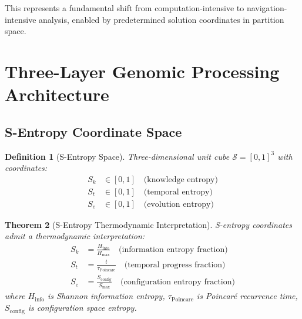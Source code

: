\documentclass[11pt,a4paper]{article}
\newtheorem{theorem}{Theorem}[section]
\newtheorem{definition}[theorem]{Definition}
\theoremstyle{remark}
\newcommand{\Sk}{S_k}
\newcommand{\St}{S_t}
\newcommand{\Se}{S_e}
\newcommand{\Sspace}{\mathcal{S}}
\begin{document}
This represents a fundamental shift from computation-intensive to navigation-intensive analysis, enabled by predetermined solution coordinates in partition space.

\section{Three-Layer Genomic Processing Architecture}

\subsection{S-Entropy Coordinate Space}

\begin{definition}[S-Entropy Space]
\label{def:s_entropy_space}
Three-dimensional unit cube $\Sspace = [0,1]^3$ with coordinates:
\begin{align}
\Sk &\in [0,1] \quad \text{(knowledge entropy)} \\
\St &\in [0,1] \quad \text{(temporal entropy)} \\
\Se &\in [0,1] \quad \text{(evolution entropy)}
\end{align}
\end{definition}

\begin{theorem}[S-Entropy Thermodynamic Interpretation]
\label{thm:s_entropy_thermo}
S-entropy coordinates admit a thermodynamic interpretation:
\begin{align}
\Sk &= \frac{H_{\text{info}}}{H_{\text{max}}} \quad \text{(information entropy fraction)} \\
\St &= \frac{t}{\tau_{\text{Poincare}}} \quad \text{(temporal progress fraction)} \\
\Se &= \frac{S_{\text{config}}}{S_{\text{max}}} \quad \text{(configuration entropy fraction)}
\end{align}
where $H_{\text{info}}$ is Shannon information entropy, $\tau_{\text{Poincare}}$ is Poincaré recurrence time, $S_{\text{config}}$ is configuration space entropy.
\end{theorem}
\end{document}
